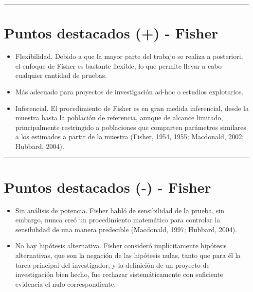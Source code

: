 \documentclass[
]{article}
\begin{document}
\begin{center}\rule{0.5\linewidth}{0.5pt}\end{center}

\hypertarget{puntos-destacados---fisher}{%
\section{Puntos destacados (+) -
Fisher}\label{puntos-destacados---fisher}}

\begin{itemize}
\item
  Flexibilidad. Debido a que la mayor parte del trabajo se realiza a
  posteriori, el enfoque de Fisher es bastante flexible, lo que permite
  llevar a cabo cualquier cantidad de pruebas.
\item
  Más adecuado para proyectos de investigación ad-hoc o estudios
  explotarios.
\item
  Inferencial. El procedimiento de Fisher es en gran medida inferencial,
  desde la muestra hasta la población de referencia, aunque de alcance
  limitado, principalmente restringido a poblaciones que comparten
  parámetros similares a los estimados a partir de la muestra (Fisher,
  1954, 1955; Macdonald, 2002; Hubbard, 2004).
\end{itemize}

\begin{center}\rule{0.5\linewidth}{0.5pt}\end{center}

\hypertarget{puntos-destacados-----fisher}{%
\section{Puntos destacados (-) -
Fisher}\label{puntos-destacados-----fisher}}

\begin{itemize}
\item
  Sin análisis de potencia. Fisher habló de sensibilidad de la prueba,
  sin embargo, nunca creó un procedimiento matemático para controlar la
  sensibilidad de una manera predecible (Macdonald, 1997; Hubbard,
  2004).
\item
  No hay hipótesis alternativa. Fisher consideró implícitamente
  hipótesis alternativas, que son la negación de las hipótesis nulas,
  tanto que para él la tarea principal del investigador, y la definición
  de un proyecto de investigación bien hecho, fue rechazar
  sistemáticamente con suficiente evidencia el nulo correspondiente.
\end{itemize}
\end{document}

